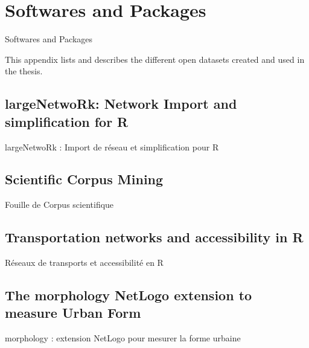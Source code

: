 
\newpage

\section{Softwares and Packages}{Softwares and Packages} %

\label{app:packages} %



\headercit{}{}{}



This appendix lists and describes the different open datasets created and used in the thesis.



\subsection{largeNetwoRk: Network Import and simplification for R}{largeNetwoRk : Import de réseau et simplification pour R}



\subsection{Scientific Corpus Mining}{Fouille de Corpus scientifique}






\subsection{Transportation networks and accessibility in R}{Réseaux de transports et accessibilité en R}







\subsection{The morphology NetLogo extension to measure Urban Form}{morphology : extension NetLogo pour mesurer la forme urbaine}

\label{app:subsec:morphologyextension}



